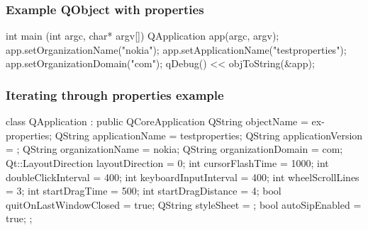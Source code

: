 \begin{slide}[fragile]
\frametitle{Example QObject with properties}
\begin{cpp}
int main (int argc, char* argv[]) {
    QApplication app(argc, argv);
    app.setOrganizationName("nokia");
    app.setApplicationName("testproperties");
    app.setOrganizationDomain("com");
    qDebug() << objToString(&app);
}
\end{cpp}
\end{slide}

\begin{slide}[fragile]
\frametitle{Iterating through properties example}
\begin{cpp}
class QApplication : public QCoreApplication {
  QString objectName = ex-properties;
  QString applicationName = testproperties;
  QString applicationVersion = ;
  QString organizationName = nokia;
  QString organizationDomain = com;
  Qt::LayoutDirection layoutDirection = 0;
  int cursorFlashTime = 1000;
  int doubleClickInterval = 400;
  int keyboardInputInterval = 400;
  int wheelScrollLines = 3;
  int startDragTime = 500;
  int startDragDistance = 4;
  bool quitOnLastWindowClosed = true;
  QString styleSheet = ;
  bool autoSipEnabled = true;
};
\end{cpp}
\end{slide}

